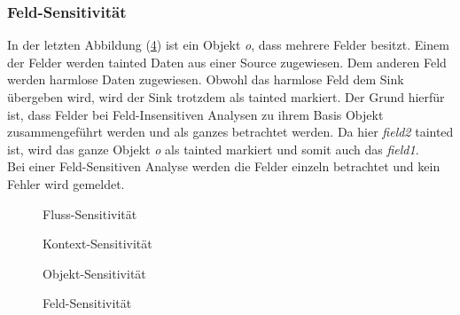 \documentclass[runningheads]{llncs}
\begin{document}
\subsubsection{Feld-Sensitivität}
In der letzten Abbildung (\ref{fig:field_code}) ist ein Objekt \emph{o}, dass mehrere Felder besitzt. Einem der Felder werden tainted Daten aus einer Source zugewiesen. Dem anderen Feld werden harmlose Daten zugewiesen. Obwohl das harmlose Feld dem Sink übergeben wird, wird der Sink trotzdem als tainted markiert. Der Grund hierfür ist, dass Felder bei Feld-Insensitiven Analysen zu ihrem Basis Objekt zusammengeführt werden und als ganzes betrachtet werden. Da hier \emph{field2} tainted ist, wird das ganze Objekt \emph{o} als tainted markiert und somit auch das \emph{field1}. 
\\Bei einer Feld-Sensitiven Analyse werden die Felder einzeln betrachtet und kein Fehler wird gemeldet.

 \begin{figure}

\caption{Fluss-Sensitivität}
\label{fig:fluss_code}
\end{figure}
\begin{figure}

\caption{Kontext-Sensitivität}
\label{fig:context_code}
\end{figure}
\begin{figure}

\caption{Objekt-Sensitivität}
\label{fig:object_code} 
\end{figure}
\begin{figure}

\caption{Feld-Sensitivität}
\label{fig:field_code}
\end{figure}
\end{document}
